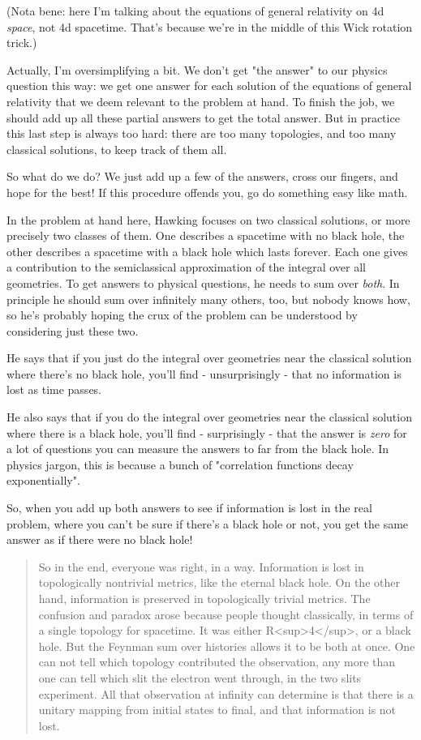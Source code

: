 (Nota bene: here I'm talking about the equations of general relativity
on 4d \emph{space}, not 4d spacetime.  That's because we're in the middle
of this Wick rotation trick.)

Actually, I'm oversimplifying a bit.  We don't get "the answer" to
our physics question this way: we get one answer for each solution 
of the equations of general relativity that we deem relevant to the 
problem at hand.  To finish the job, we should add up all these partial
answers to get the total answer.  But in practice this last step is 
always too hard: there are too many topologies, and too many classical
solutions, to keep track of them all.

So what do we do?  We just add up a few of the answers, cross our 
fingers, and hope for the best!  If this procedure offends you, go 
do something easy like math.

In the problem at hand here, Hawking focuses on two classical solutions,
or more precisely two classes of them.  One describes a spacetime with no 
black hole, the other describes a spacetime with a black hole which lasts
forever.  Each one gives a contribution to the semiclassical approximation 
of the integral over all geometries.  To get answers to physical questions, 
he needs to sum over \emph{both}.   
In principle he should sum over infinitely 
many others, too, but nobody knows how, so he's probably hoping the crux 
of the problem can be understood by considering just these two.   

He says that if you just do the integral over geometries near the
classical solution where there's no black hole, you'll find - 
unsurprisingly - that no information is lost as time passes.

He also says that if you do the integral over geometries near the
classical solution where there is a black hole, you'll find -
surprisingly - that the answer is \emph{zero} for a lot of questions 
you can measure the answers to far from the black hole.  In physics 
jargon, this is because a bunch of "correlation functions decay 
exponentially".

So, when you add up both answers to see if information is lost in the
real problem, where you can't be sure if there's a black hole or not,
you get the same answer as if there were no black hole!  

\begin{quote}
     So in the end, everyone was right, in a way.  Information is lost 
     in topologically nontrivial metrics, like the eternal black hole. 
     On the other hand, information is preserved in topologically trivial
     metrics. The confusion and paradox arose because people thought
     classically, in terms of a single topology for spacetime.  It was
     either R<sup>4</sup>, or a black hole.  But the Feynman sum over histories allows
     it to be both at once.  One can not tell which topology contributed the
     observation, any more than one can tell which slit the electron went
     through, in the two slits experiment.  All that observation at infinity
     can determine is that there is a unitary mapping from initial states
     to final, and that information is not lost.
\end{quote}
    

